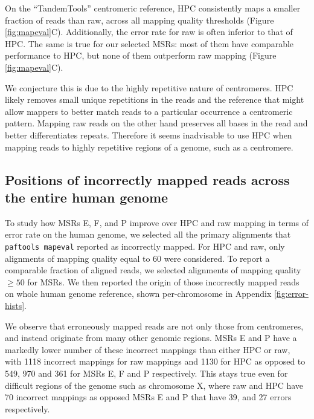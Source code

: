 \documentclass[
  11pt,
  twoside]{scrbook}
\begin{document}
On the ``TandemTools'' centromeric reference, HPC consistently maps a smaller
fraction of reads than raw, across all mapping quality thresholds (Figure
\ref{fig:mapeval}C). Additionally, the error rate for raw is often inferior to
that of HPC. The same is true for our selected MSRs: most of them have
comparable performance to HPC, but none of them outperform raw mapping (Figure
\ref{fig:mapeval}C).

We conjecture this is due to the highly repetitive nature of centromeres. HPC
likely removes small unique repetitions in the reads and the reference that
might allow mappers to better match reads to a particular occurrence a
centromeric pattern. Mapping raw reads on the other hand preserves all bases in
the read and better differentiates repeats. Therefore it seems inadvisable to
use HPC when mapping reads to highly repetitive regions of a genome, such as a
centromere.

\hypertarget{positions-of-incorrectly-mapped-reads-across-the-entire-human-genome}{%
\subsection{Positions of incorrectly mapped reads across the entire human genome}\label{positions-of-incorrectly-mapped-reads-across-the-entire-human-genome}}

To study how MSRs E, F, and P improve over HPC and raw mapping in terms of error
rate on the human genome, we selected all the primary alignments that
\texttt{paftools\ mapeval} reported as incorrectly mapped. For HPC and raw, only
alignments of mapping quality equal to 60 were considered. To report a
comparable fraction of aligned reads, we selected alignments of mapping quality
\(\geq 50\) for MSRs. We then reported the origin of those incorrectly mapped
reads on whole human genome reference, shown per-chromosome in Appendix
\ref{fig:error-hists}.

We observe that erroneously mapped reads are not only those from centromeres,
and instead originate from many other genomic regions. MSRs E and P have a
markedly lower number of these incorrect mappings than either HPC or raw, with
1118 incorrect mappings for raw mappings and 1130 for HPC as opposed to 549, 970
and 361 for MSRs E, F and P respectively. This stays true even for difficult
regions of the genome such as chromosome X, where raw and HPC have 70 incorrect
mappings as opposed MSRs E and P that have 39, and 27 errors respectively.
\end{document}
